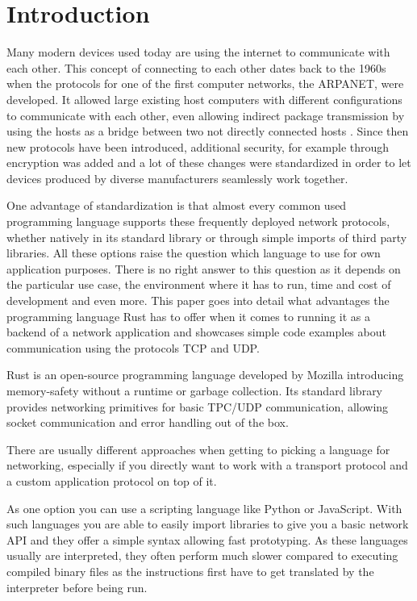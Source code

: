 
\section{Introduction} \label{introduction}
Many modern devices used today are using the internet to communicate with each other. This concept of connecting to
each other dates back to the 1960s when the protocols for one of the first computer networks, the ARPANET, were
developed. It allowed large existing host computers with different configurations to communicate with each other, even
allowing indirect package transmission by using the hosts as a bridge between two not directly connected hosts
\cite{f70arpa}. Since then new protocols have been introduced, additional security, for example through encryption was
added and a lot of these changes were standardized in order to let devices produced by diverse manufacturers seamlessly
work together.

One advantage of standardization is that almost every common used programming language supports these frequently
deployed network protocols, whether natively in its standard library or through simple imports of third party
libraries. All these options raise the question which language to use for own application purposes. There is no right
answer to this question as it depends on the particular use case, the environment where it has to run, time and cost of
development and even more. This paper goes into detail what advantages the programming language Rust has to offer when
it comes to running it as a backend of a network application and showcases simple code examples about communication
using the protocols TCP and UDP.

Rust is an open-source programming language developed by Mozilla introducing memory-safety without a runtime or garbage
collection. Its standard library provides networking primitives for basic TPC/UDP communication, allowing socket
communication and error handling out of the box. \cite{rust-language}

There are usually different approaches when getting to picking a language for networking, especially if you directly
want to work with a transport protocol and a custom application protocol on top of it.

As one option you can use a scripting language like Python or JavaScript. With such languages you are able to easily
import libraries to give you a basic network API and they offer a simple syntax allowing fast prototyping. As these
languages usually are interpreted, they often perform much slower compared to executing compiled binary files as the
instructions first have to get translated by the interpreter before being run.

